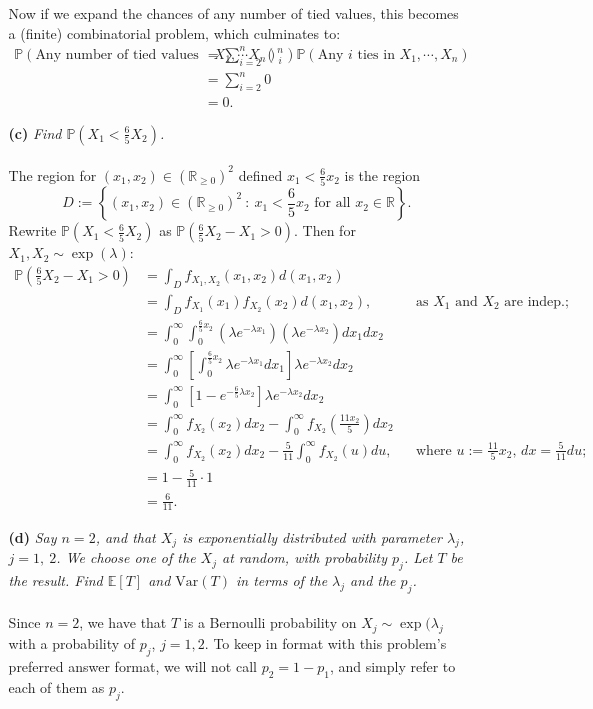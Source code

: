 \documentclass [10pt] {article}
\newcommand{\R}{\mathbb{R}}
\newcommand{\ds}{\displaystyle}
\newcommand{\Var}{\mathrm{Var}}
\newcommand{\E}{\mathbb{E}}
\renewcommand{\P}{\mathbb{P}}
\begin{document}
\begin{enumerate}
\begin{enumerate}
Now if we expand the chances of any number of tied values, this becomes a (finite) combinatorial problem, which culminates to:
\begin{align*}\P\left(\text{Any number of tied values in }X_1,\cdots X_n\right)&=\sum_{i=2}^n \binom{n}{i}\P\left(\text{Any $i$ ties in }X_1,\cdots,X_n\right)\\
&=\sum_{i=2}^n 0\\
&= 0.
\end{align*}
\newpage
\item[{\bf(c)}] {\it Find $\ds\P\left(X_1 < \frac{6}{5}X_2\right)$.}\\\\
The region for $(x_1,x_2)\in(\R_{\ge0})^2$ defined $\ds x_1<\frac{6}{5}x_2$ is the region
$$D:=\left\{(x_1,x_2)\in(\R_{\ge0})^2 \ : \ x_1<\frac{6}{5}x_2 \text{ \ for all \ }x_2\in\R\right\}.$$
Rewrite $\ds\P\left(X_1<\frac{6}{5}X_2\right)$ as $\ds\P\left(\frac{6}{5}X_2-X_1>0\right)$. Then for $X_1,X_2\sim\exp(\lambda)$:
\begin{align*}
    \P\left(\frac{6}{5}X_2-X_1>0\right) 
    &=\int_D f_{X_1,X_2}(x_1,x_2)d(x_1,x_2)\\
    &=\int_D f_{X_1}(x_1)f_{X_2}(x_2)d(x_1,x_2),&&\text{as $X_1$ and $X_2$ are indep.;}\\
    &=\int_0^\infty\int_0^{\frac{6}{5}x_2}\left(\lambda e^{-\lambda x_1}\right)\left(\lambda e^{-\lambda x_2}\right)dx_1dx_2\\
    &=\int_0^\infty\left[\int_0^{\frac{6}{5}x_2}\lambda e^{-\lambda x_1}dx_1\right]\lambda e^{-\lambda x_2}dx_2\\
    &=\int_0^\infty\left[1-e^{-\frac{6}{5}\lambda x_2}\right]\lambda e^{-\lambda x_2}dx_2\\
    &=\int_0^\infty f_{X_2}(x_2)dx_2-\int_0^\infty f_{X_2}\left(\frac{11 x_2}{5}\right)dx_2\\
    &=\int_0^\infty f_{X_2}(x_2)dx_2-\frac{5}{11}\int_0^\infty f_{X_2}\left(u\right)du,&&\text{where $u:=\frac{11}{5}x_2$, $dx=\frac{5}{11}du$;}\\
    &=1-\frac{5}{11}\cdot1\\
    &=\frac{6}{11}.
\end{align*}
\newpage
\item[{\bf(d)}] {\it Say $n = 2$, and that $X_j$ is exponentially distributed with parameter $\lambda_j$, $j = 1,\ 2$. We choose one of the $X_j$ at random, with probability $p_j$. Let $T$ be the result. Find $\E[T]$ and $\Var(T)$ in terms of the $\lambda_j$ and the $p_j$.}\\\\
Since $n = 2$, we have that $T$ is a Bernoulli probability on $X_j\sim\exp(\lambda_j$ with a probability of $p_j$, $j = 1,2$. To keep in format with this problem's preferred answer format, we will not call $p_2=1-p_1$, and simply refer to each of them as $p_j$.


\end{enumerate}
\end{enumerate}
\end{document}
